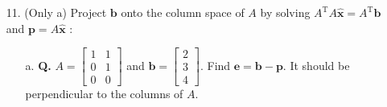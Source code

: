 \documentclass[main.tex]{subfiles}
\begin{document}
\begin{enumerate}
    \item [11.] (Only a) Project $\boldsymbol{b}$ onto the column space of $A$ by solving $A^{\mathrm{T}} A \widehat{\boldsymbol{x}}=A^{\mathrm{T}} \boldsymbol{b}$ and $\boldsymbol{p}=A \widehat{\boldsymbol{x}}$ :
    \begin{enumerate}
        \item [a.] \textbf{Q.} $A=\left[\begin{array}{ll}1 & 1 \\ 0 & 1 \\ 0 & 0\end{array}\right]$ and $\bm{b}=\left[\begin{array}{l}2 \\ 3 \\ 4\end{array}\right]$. Find $\bm{e}=\bm{b}-\bm{p}$. It should be perpendicular to the columns of $A$. 
        

\end{enumerate}
\end{enumerate}
\end{document}
